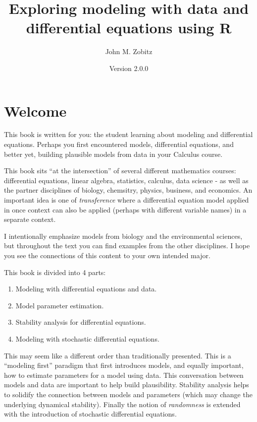 \documentclass[
]{book}
\title{Exploring modeling with data and differential equations using R}
\author{John M. Zobitz}
\date{Version 2.0.0}
\providecommand{\tightlist}{%
  \setlength{\itemsep}{0pt}\setlength{\parskip}{0pt}}
\theoremstyle{definition}
\theoremstyle{definition}
\theoremstyle{definition}
\theoremstyle{remark}
\begin{document}
\maketitle

{
\setcounter{tocdepth}{1}
\tableofcontents
}
\hypertarget{welcome}{%
\chapter*{Welcome}\label{welcome}}

This book is written for you: the student learning about modeling and differential equations. Perhaps you first encountered models, differential equations, and better yet, building plausible models from data in your Calculus course.

This book sits ``at the intersection'' of several different mathematics courses: differential equations, linear algebra, statistics, calculus, data science - as well as the partner disciplines of biology, chemsitry, physics, business, and economics. An important idea is one of \emph{transference} where a differential equation model applied in once context can also be applied (perhaps with different variable names) in a separate context.

I intentionally emphasize models from biology and the environmental sciences, but throughout the text you can find examples from the other disciplines. I hope you see the connections of this content to your own intended major.

This book is divided into 4 parts:

\begin{enumerate}
\def\labelenumi{\arabic{enumi}.}
\tightlist
\item
  Modeling with differential equations and data.
\item
  Model parameter estimation.
\item
  Stability analysis for differential equations.
\item
  Modeling with stochastic differential equations.
\end{enumerate}

This may seem like a different order than traditionally presented. This is a ``modeling first'' paradigm that first introduces models, and equally important, how to estimate parameters for a model using data. This conversation between models and data are important to help build plausibility. Stability analysis helps to solidify the connection between models and parameters (which may change the underlying dynamical stability). Finally the notion of \emph{randomness} is extended with the introduction of stochastic differential equations.
\end{document}
